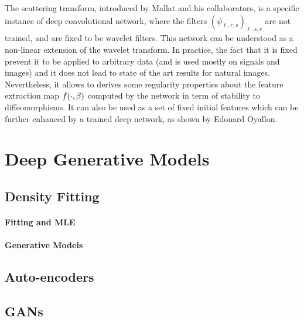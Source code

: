 The scattering transform, introduced by Mallat and his collaborators, is a specific instance of deep convolutional network, where the filters $ (\psi_{\ell,r,s})_{\ell,s,r}$ are not trained, and are fixed to be wavelet filters. This network can be understood as a non-linear extension of the wavelet transform. In practice, the fact that it is fixed prevent it to be applied to arbitrary data (and is used mostly on signals and images) and it does not lead to state of the art results for natural images. Nevertheless, it allows to derives some regularity properties about the feature extraction map $f(\cdot,\beta)$ computed by the network in term of stability to diffeomorphisms. It can also be used as a set of fixed initial features which can be further enhanced by a trained deep network, as shown by Edouard Oyallon.  


\section{Deep Generative Models}
\label{sec-deepnet-gen}


\subsection{Density Fitting}

\paragraph{Fitting and MLE}

\paragraph{Generative Models}

\subsection{Auto-encoders}

\subsection{GANs}

\fi